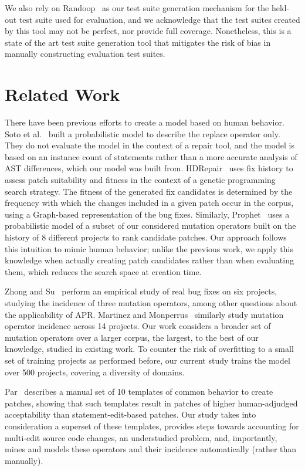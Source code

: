 \documentclass[conference]{IEEEtran}
\begin{document}
We also rely on Randoop~\cite{pacheco07} as our test suite generation mechanism 
for the held-out test suite used for evaluation, and we acknowledge that the 
test suites created by this tool may not be perfect, nor provide full coverage. 
Nonetheless, this is a state of the art test suite generation tool that mitigates the risk of bias in manually constructing evaluation test suites.

\section{Related Work} \label{relatedWork}

There have been previous efforts to create a model based on human behavior.  
Soto et al.~\cite{Soto16} 
built a probabilistic model to describe the replace 
operator only. They do not evaluate the model in the context of a repair
tool, and the model is based on an instance count of statements rather than a more 
accurate analysis of AST differences, which our model was built from.  
HDRepair~\cite{xuan16} 
uses fix history
to assess patch suitability and fitness in the context of a genetic
programming search strategy. The fitness of the generated
fix candidates is determined by the frequency with which the changes included in
a given patch occur in the corpus, using a Graph-based representation of the bug
fixes.  Similarly, Prophet~\cite{long16proph} uses a
probabilistic model of a subset of our considered mutation operators built on 
the history of 8 different projects to rank candidate
patches.  Our approach follows this intuition to mimic human
behavior; unlike the previous work, we apply this knowledge when actually
creating patch candidates rather than when evaluating them, which reduces the 
search space at creation time.  

Zhong and Su~\cite{zhong15} perform an empirical study of
real bug fixes on six projects, studying the incidence of three mutation
operators, among other questions about the applicability of APR.  Martinez and
Monperrus~\cite{martinez15} similarly study mutation operator incidence across 
14 
projects. Our work considers a broader set of
mutation operators over a larger corpus, the largest, to the best of our
knowledge, studied in existing work. To counter the 
risk of overfitting to a small set of training projects as performed before, our 
current study trains the model over 500 projects, covering a diversity 
of domains.

Par~\cite{kim2013} describes a manual set of 10 templates of common behavior to
create patches, showing that such templates result in patches of higher
human-adjudged acceptability than statement-edit-based patches.  Our study takes 
into consideration a superset
of these templates, provides steps towards
accounting for multi-edit source code changes, an understudied problem, and,
importantly, mines and models these operators and their incidence automatically
(rather than manually).
\end{document}
